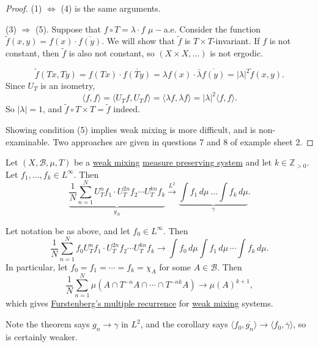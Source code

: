 \documentclass{article}
\begin{document}
\begin{proof}
  (1) $\Leftrightarrow$ (4) is the same arguments.

  (3) $\Rightarrow$ (5). Suppose that $f \circ T = \lambda \cdot f$ $\mu-$a.e.
  Consider the function $\tilde{f}(x,y) = f(x) \cdot \overline{f(y)}$.
  We will show that $\tilde{f}$ is $T \times T$-invariant.
  If $f$ is not constant, then $\tilde{f}$ is also not constant, so $(X \times X, \dotsc)$ is not ergodic.

  \begin{equation*}
    \tilde{f}(Tx, Ty) = f(Tx) \cdot \overline{f(Ty)} = \lambda f(x) \cdot \bar{\lambda} \overline{f(y)} = |\lambda|^2 \tilde{f}(x,y).
  \end{equation*}
  Since $U_T$ is an isometry,
  \begin{equation*}
    \langle f, f \rangle = \langle U_T f, U_T f \rangle = \langle \lambda f, \lambda f\rangle = |\lambda|^2 \langle f,f\rangle.
  \end{equation*}
  So $|\lambda| = 1$, and $\tilde{f} \circ T \times T = \tilde{f}$ indeed.

  Showing condition (5) implies weak mixing is more difficult, and is non-examinable. Two approaches are given in questions 7 and 8 of example sheet 2.
\end{proof}
\begin{thm}
  Let $(X, \mathcal{B}, \mu, T)$ be a \hyperlink{def:wMixing}{weak mixing} \hyperlink{def:mps}{measure preserving system} and let $k \in \mathbb{Z}_{>0}$.
  Let $f_1, \dotsc, f_k \in L^\infty$. Then
  \begin{equation*}
    \underbrace{\frac{1}{N} \sum_{n=1}^N U_T^n f_1 \cdot U_T^{2n} f_2 \dotsm U_T^{kn} f_k}_{g_N} \overset{L^2}{\longrightarrow} \underbrace{\int\!f_1 \, d\mu\ \dots \int\!f_k \, d\mu}_\gamma.
  \end{equation*}
\end{thm}

\begin{cor}
  Let notation be as above, and let $f_0 \in L^\infty$.
  Then
  \begin{equation*}
    \frac{1}{N}\sum_{n=1}^N f_0 U_T^n f_1 \cdot U_T^{2n} f_2 \dotsm U_T^{kn} f_k \longrightarrow \int\!f_0\,d\mu \int\!f_1\,d\mu\,\dotsi \int\!f_k\,d\mu.
  \end{equation*}
  In particular, let $f_0 = f_1 = \dotsb = f_k = \chi_A$ for some $A \in \mathcal{B}$.
  Then
  \begin{equation*}
    \frac{1}{N} \sum_{n=1}^N \mu(A \cap T^{-n} A \cap \dotsb \cap T^{-nk} A) \to \mu(A)^{k+1},
  \end{equation*}
  which gives \hyperlink{thm:furs}{Furstenberg's multiple recurrence} for \hyperlink{def:wMixing}{weak mixing} systems.
\end{cor}
Note the theorem says $g_n \to \gamma$ in $L^2$, and the corollary says $\langle f_0, \overline{g_n} \rangle \to \langle f_0, \overline{\gamma} \rangle$, so is certainly weaker.
\end{document}
